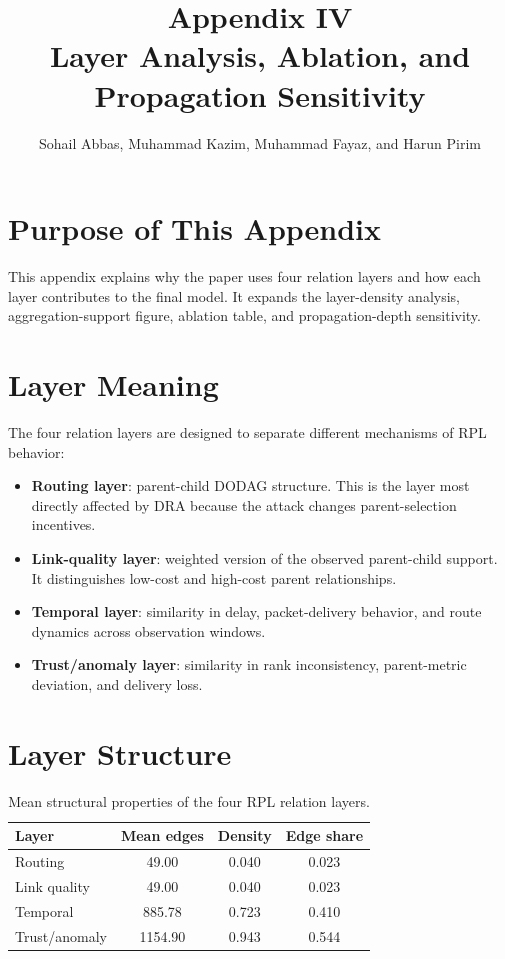 \documentclass[10pt]{article}
\title{\vspace{-1.2cm}Appendix IV\\Layer Analysis, Ablation, and Propagation Sensitivity}
\author{Sohail Abbas, Muhammad Kazim, Muhammad Fayaz, and Harun Pirim}
\date{}
\begin{document}
\maketitle

\section{Purpose of This Appendix}
This appendix explains why the paper uses four relation layers and how each layer contributes to the final model. It expands the layer-density analysis, aggregation-support figure, ablation table, and propagation-depth sensitivity.

\section{Layer Meaning}
The four relation layers are designed to separate different mechanisms of RPL behavior:
\begin{itemize}
\item \textbf{Routing layer}: parent-child DODAG structure. This is the layer most directly affected by DRA because the attack changes parent-selection incentives.
\item \textbf{Link-quality layer}: weighted version of the observed parent-child support. It distinguishes low-cost and high-cost parent relationships.
\item \textbf{Temporal layer}: similarity in delay, packet-delivery behavior, and route dynamics across observation windows.
\item \textbf{Trust/anomaly layer}: similarity in rank inconsistency, parent-metric deviation, and delivery loss.
\end{itemize}

\section{Layer Structure}
\begin{table}[H]
\centering
\caption{Mean structural properties of the four RPL relation layers.}
\small
\begin{tabular}{lccc}
\toprule
Layer & Mean edges & Density & Edge share\\
\midrule
Routing & 49.00 & 0.040 & 0.023\\
Link quality & 49.00 & 0.040 & 0.023\\
Temporal & 885.78 & 0.723 & 0.410\\
Trust/anomaly & 1154.90 & 0.943 & 0.544\\
\bottomrule
\end{tabular}
\end{table}
\end{document}
